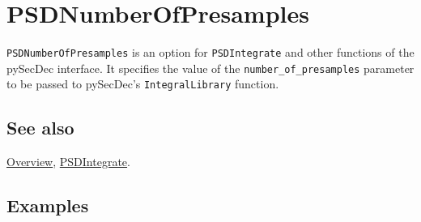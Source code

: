 \documentclass[../FeynHelpersManual.tex]{subfiles}
\begin{document}
\hypertarget{psdnumberofpresamples}{
\section{PSDNumberOfPresamples}\label{psdnumberofpresamples}}

\texttt{PSDNumberOfPresamples} is an option for \texttt{PSDIntegrate}
and other functions of the pySecDec interface. It specifies the value of
the \texttt{number_of_presamples} parameter to be passed to pySecDec's
\texttt{IntegralLibrary} function.

\subsection{See also}

\hyperlink{toc}{Overview}, \hyperlink{psdintegrate}{PSDIntegrate}.

\subsection{Examples}
\end{document}
